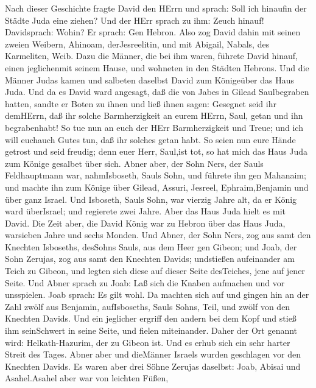  Nach dieser Geschichte fragte David den HErrn und sprach:
Soll ich hinaufin der Städte Juda eine ziehen? Und der HErr sprach zu
ihm: Zeuch hinauf! Davidsprach: Wohin? Er sprach: Gen Hebron.
 Also zog David dahin mit seinen zweien Weibern, Ahinoam,
derJesreelitin, und mit Abigail, Nabals, des Karmeliten, Weib.
 Dazu die Männer, die bei ihm waren, führete David hinauf,
einen jeglichenmit seinem Hause, und wohneten in den Städten Hebrons.
 Und die Männer Judas kamen und salbeten daselbst David zum
Königeüber das Haus Juda. Und da es David ward angesagt, daß die von
Jabes in Gilead Saulbegraben hatten,  sandte er Boten zu
ihnen und ließ ihnen sagen: Gesegnet seid ihr demHErrn, daß ihr solche
Barmherzigkeit an eurem HErrn, Saul, getan und ihn begrabenhabt!
 So tue nun an euch der HErr Barmherzigkeit und Treue; und
ich will euchauch Gutes tun, daß ihr solches getan habt.  So
seien nun eure Hände getrost und seid freudig; denn euer Herr, Saul,ist
tot, so hat mich das Haus Juda zum Könige gesalbet über sich.
 Abner aber, der Sohn Ners, der Sauls Feldhauptmann war,
nahmIsboseth, Sauls Sohn, und führete ihn gen Mahanaim;  und
machte ihn zum Könige über Gilead, Assuri, Jesreel, Ephraim,Benjamin und
über ganz Israel.  Und Isboseth, Sauls Sohn, war vierzig
Jahre alt, da er König ward überIsrael; und regierete zwei Jahre. Aber
das Haus Juda hielt es mit David.  Die Zeit aber, die David
König war zu Hebron über das Haus Juda, warsieben Jahre und sechs
Monden.  Und Abner, der Sohn Ners, zog aus samt den
Knechten Isboseths, desSohns Sauls, aus dem Heer gen Gibeon;
 und Joab, der Sohn Zerujas, zog aus samt den Knechten
Davids; undstießen aufeinander am Teich zu Gibeon, und legten sich diese
auf dieser Seite desTeiches, jene auf jener Seite.  Und
Abner sprach zu Joab: Laß sich die Knaben aufmachen und vor unsspielen.
Joab sprach: Es gilt wohl.  Da machten sich auf und gingen
hin an der Zahl zwölf aus Benjamin, aufIsboseths, Sauls Sohns, Teil, und
zwölf von den Knechten Davids.  Und ein jeglicher ergriff
den andern bei dem Kopf und stieß ihm seinSchwert in seine Seite, und
fielen miteinander. Daher der Ort genannt wird: Helkath-Hazurim, der zu
Gibeon ist.  Und es erhub sich ein sehr harter Streit des
Tages. Abner aber und dieMänner Israels wurden geschlagen vor den
Knechten Davids.  Es waren aber drei Söhne Zerujas
daselbst: Joab, Abisai und Asahel.Asahel aber war von leichten Füßen,
